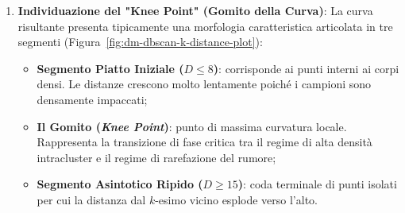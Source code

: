 \begin{enumerate}
    \item \textbf{Individuazione del "Knee Point" (Gomito della Curva)}:
    La curva risultante presenta tipicamente una morfologia caratteristica articolata in tre segmenti (Figura~\ref{fig:dm-dbscan-k-distance-plot}):
    \begin{itemize}[noitemsep]
        \item \textbf{Segmento Piatto Iniziale ($D \le 8$)}: corrisponde ai punti interni ai corpi densi. Le distanze crescono molto lentamente poiché i campioni sono densamente impaccati;
        \item \textbf{Il Gomito (\textit{Knee Point})}: punto di massima curvatura locale. Rappresenta la transizione di fase critica tra il regime di alta densità intracluster e il regime di rarefazione del rumore;
        \item \textbf{Segmento Asintotico Ripido ($D \ge 15$)}: coda terminale di punti isolati per cui la distanza dal $k$-esimo vicino esplode verso l'alto.
    \end{itemize}
\end{enumerate}

